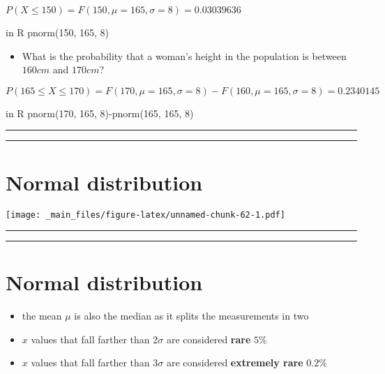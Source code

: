 \documentclass[
]{book}
\providecommand{\tightlist}{%
  \setlength{\itemsep}{0pt}\setlength{\parskip}{0pt}}
\begin{document}
\(P(X\le 150)=F(150, \mu=165, \sigma=8)=0.03039636\)

in R pnorm(150, 165, 8)

\begin{itemize}
\tightlist
\item
  What is the probability that a woman's height in the population is between \(160cm\) and \(170cm\)?
\end{itemize}

\(P(165 \le X \le 170)=F(170, \mu=165, \sigma=8)-F(160, \mu=165, \sigma=8)=0.2340145\)

in R pnorm(170, 165, 8)-pnorm(165, 165, 8)

\begin{center}\rule{0.5\linewidth}{0.5pt}\end{center}

\begin{center}\rule{0.5\linewidth}{0.5pt}\end{center}

\hypertarget{normal-distribution-3}{%
\section{Normal distribution}\label{normal-distribution-3}}

\texttt{[image: \_main\_files/figure-latex/unnamed-chunk-62-1.pdf]}

\begin{center}\rule{0.5\linewidth}{0.5pt}\end{center}

\begin{center}\rule{0.5\linewidth}{0.5pt}\end{center}

\hypertarget{normal-distribution-4}{%
\section{Normal distribution}\label{normal-distribution-4}}

\begin{itemize}
\tightlist
\item
  the mean \(\mu\) is also the median as it splits the measurements in two
\item
  \(x\) values that fall farther than 2\(\sigma\) are considered \textbf{rare} \(5\%\)
\item
  \(x\) values that fall farther than 3\(\sigma\) are considered \textbf{extremely rare} \(0.2\%\)
\end{itemize}
\end{document}
